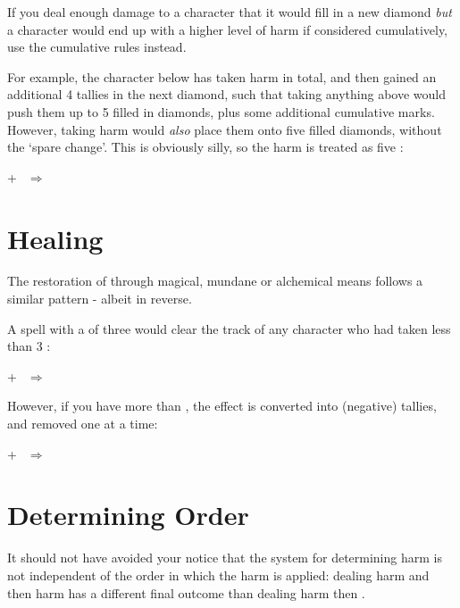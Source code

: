If you deal enough damage to a character that it would fill in a new diamond {\it but} a character would end up with a higher level of harm if considered cumulatively, use the cumulative rules instead. 

For example, the character below has taken  harm in total, and then gained an additional 4 tallies in the next diamond, such that taking anything above  would push them up to 5 filled in diamonds, plus some additional cumulative marks. However, taking  harm would {\it also} place them onto five filled diamonds, without the `spare change'. This is obviously silly, so the harm is treated as five :


\begin{center}
	 + $~~\Longrightarrow~~$
\end{center}



\section{Healing}

The restoration of  through magical, mundane or alchemical means follows a similar pattern - albeit in reverse. 

A  spell with a  of three would clear the  track of any character who had taken less than 3 :

\begin{center}
	 + $~~\Longrightarrow~~$
\end{center}

However, if you have more  than , the effect is converted into (negative) tallies, and removed one at a time:

\begin{center}
	 + $~~\Longrightarrow~~$
\end{center}

\section{Determining Order}

It should not have avoided your notice that the system for determining harm is not independent of the order in which the harm is applied: dealing  harm and then  harm has a different final outcome than dealing  harm then . 

